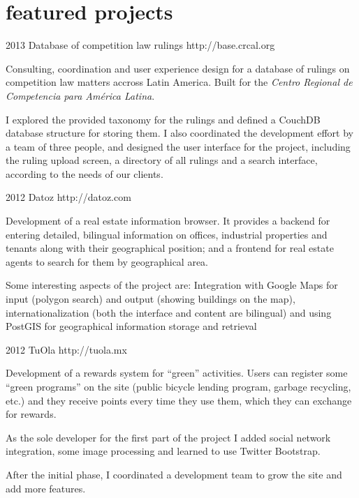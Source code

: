 \documentclass[]{friggeri-cv} %
\begin{document}
\section{featured projects}

\begin{entrylist}
\entry
{2013}
{Database of competition law rulings}
{http://base.crcal.org}
{Consulting, coordination and user experience design for a database of rulings on competition law matters accross Latin America. Built for the \emph{Centro Regional de Competencia para América Latina}.

I explored the provided taxonomy for the rulings and defined a CouchDB database structure for storing them. I also coordinated the development effort by a team of three people, and designed the user interface for the project, including the ruling upload screen, a directory of all rulings and a search interface, according to the needs of our clients.}
\entry
{2012}
{Datoz}
{http://datoz.com}
{Development of a real estate information browser. It provides a backend for entering detailed, bilingual information on offices, industrial properties and tenants along with their geographical position; and a frontend for real estate agents to search for them by geographical area.

Some interesting aspects of the project are: Integration with Google Maps for input (polygon search) and output (showing buildings on the map), internationalization (both the interface and content are bilingual) and using PostGIS for geographical information storage and retrieval}
\entry
{2012}
{TuOla}
{http://tuola.mx}
{Development of a rewards system for “green” activities. Users can register some “green programs” on the site (public bicycle lending program, garbage recycling, etc.) and they receive points every time they use them, which they can exchange for rewards.

As the sole developer for the first part of the project I added social network integration, some image processing and learned to use Twitter Bootstrap.

After the initial phase, I coordinated a development team to grow the site and add more features.}
\end{entrylist}
\end{document}
